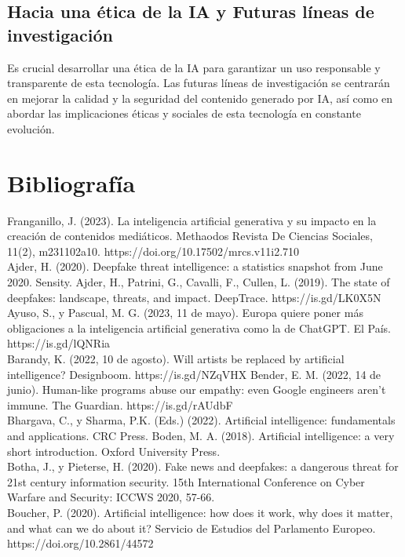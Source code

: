 \documentclass[12pt]{article}
\begin{document}
\subsection{Hacia una ética de la IA y Futuras líneas de investigación}
Es crucial desarrollar una ética de la IA para garantizar un uso responsable y transparente de esta tecnología. Las futuras líneas de investigación se centrarán en mejorar la calidad y la seguridad del contenido generado por IA, así como en abordar las implicaciones éticas y sociales de esta tecnología en constante evolución.\\

\section{Bibliografía}
Franganillo, J. (2023). La inteligencia artificial generativa y su impacto en la creación de contenidos mediáticos. Methaodos Revista De Ciencias Sociales, 11(2), m231102a10. https://doi.org/10.17502/mrcs.v11i2.710\\
Ajder, H. (2020). Deepfake threat intelligence: a statistics snapshot from June 2020. Sensity.
Ajder, H., Patrini, G., Cavalli, F.,  Cullen, L. (2019). The state of deepfakes: landscape, threats, and impact.
DeepTrace. https://is.gd/LK0X5N\\
Ayuso, S., y Pascual, M. G. (2023, 11 de mayo). Europa quiere poner más obligaciones a la inteligencia artificial
generativa como la de ChatGPT. El País. https://is.gd/lQNRia\\
Barandy, K. (2022, 10 de agosto). Will artists be replaced by artificial intelligence? Designboom. https://is.gd/NZqVHX
Bender, E. M. (2022, 14 de junio). Human-like programs abuse our empathy: even Google engineers aren’t
immune. The Guardian. https://is.gd/rAUdbF\\
Bhargava, C., y Sharma, P.K. (Eds.) (2022). Artificial intelligence: fundamentals and applications. CRC Press.
Boden, M. A. (2018). Artificial intelligence: a very short introduction. Oxford University Press.\\
Botha, J., y Pieterse, H. (2020). Fake news and deepfakes: a dangerous threat for 21st century information
security. 15th International Conference on Cyber Warfare and Security: ICCWS 2020, 57-66.\\
Boucher, P. (2020). Artificial intelligence: how does it work, why does it matter, and what can we do about it?
Servicio de Estudios del Parlamento Europeo. https://doi.org/10.2861/44572\\
\end{document}

